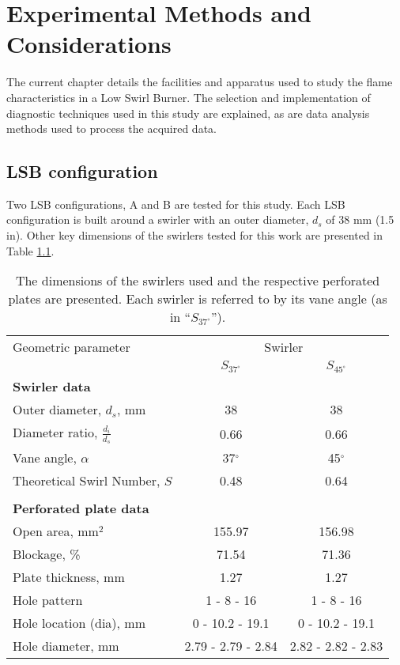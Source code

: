 \chapter{Experimental Methods and Considerations}

The current chapter details the facilities and apparatus used to study the flame characteristics in a Low Swirl Burner.
The selection and implementation of diagnostic techniques used in this study are explained, as are data analysis methods used to process the acquired data.

\section{LSB configuration}

Two LSB configurations, A and B are tested for this study.
Each LSB configuration is built around a swirler with an outer diameter, \(d_s\) of 38 mm (1.5 in).
Other key dimensions of the swirlers tested for this work are presented in Table \ref{tab:swirlerdimensions}.

\begin{table}

\caption[Swirler Dimensions]{The dimensions of the swirlers used and the respective perforated plates are presented. Each swirler is referred to by its vane angle (as in ``\(S_{37^\circ}\)'').}

\begin{center}
\begin{tabular}{lcc}
  Geometric parameter & \multicolumn{2}{c}{Swirler} \tabularnewline
  & \(S_{37^\circ}\) & \(S_{45^\circ}\) \tabularnewline
  \hline \hline
  \textbf{Swirler data} & & \tabularnewline
  Outer diameter, \(d_s\), mm & 38 & 38 \tabularnewline
  Diameter ratio, \(\frac{d_i}{d_s}\) & 0.66 & 0.66 \tabularnewline
  Vane angle, \(\alpha\) & 37\(^\circ\) & 45\(^\circ\) \tabularnewline
  Theoretical Swirl Number, \(S\) & 0.48 & 0.64 \tabularnewline
  & & \tabularnewline
  \textbf{Perforated plate data} & & \tabularnewline
  Open area, mm\(^2\) & 155.97 & 156.98 \tabularnewline
  Blockage, \% & 71.54 & 71.36 \tabularnewline
  Plate thickness, mm & 1.27 & 1.27 \tabularnewline
  Hole pattern & 1 - 8 - 16 & 1 - 8 - 16 \tabularnewline
  Hole location (dia), mm & 0 - 10.2 - 19.1 & 0 - 10.2 - 19.1 \tabularnewline
  Hole diameter, mm & 2.79 - 2.79 - 2.84 & 2.82 - 2.82 - 2.83 \tabularnewline
\end{tabular}
\end{center}

\label{tab:swirlerdimensions}

\end{table}

